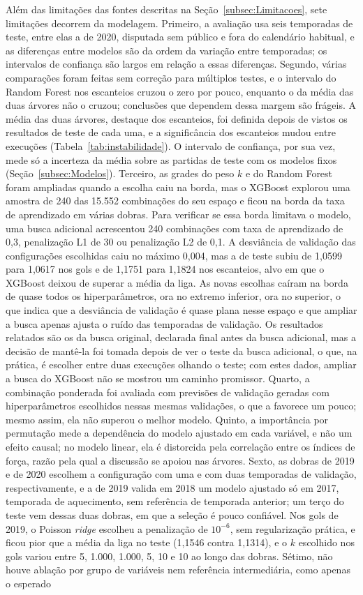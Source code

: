 Além das limitações das fontes descritas na Seção~\ref{subsec:Limitacoes}, sete limitações decorrem da modelagem. Primeiro, a avaliação usa seis temporadas de teste, entre elas a de 2020, disputada sem público e fora do calendário habitual, e as diferenças entre modelos são da ordem da variação entre temporadas; os intervalos de confiança são largos em relação a essas diferenças. Segundo, várias comparações foram feitas sem correção para múltiplos testes, e o intervalo do Random Forest nos escanteios cruzou o zero por pouco, enquanto o da média das duas árvores não o cruzou; conclusões que dependem dessa margem são frágeis. A média das duas árvores, destaque dos escanteios, foi definida depois de vistos os resultados de teste de cada uma, e a significância dos escanteios mudou entre execuções (Tabela~\ref{tab:instabilidade}). O intervalo de confiança, por sua vez, mede só a incerteza da média sobre as partidas de teste com os modelos fixos (Seção~\ref{subsec:Modelos}). Terceiro, as grades do peso $k$ e do Random Forest foram ampliadas quando a escolha caiu na borda, mas o XGBoost explorou uma amostra de 240 das 15.552 combinações do seu espaço e ficou na borda da taxa de aprendizado em várias dobras. Para verificar se essa borda limitava o modelo, uma busca adicional acrescentou 240 combinações com taxa de aprendizado de 0,3, penalização L1 de 30 ou penalização L2 de 0,1. A desviância de validação das configurações escolhidas caiu no máximo 0,004, mas a de teste subiu de 1,0599 para 1,0617 nos gols e de 1,1751 para 1,1824 nos escanteios, alvo em que o XGBoost deixou de superar a média da liga. As novas escolhas caíram na borda de quase todos os hiperparâmetros, ora no extremo inferior, ora no superior, o que indica que a desviância de validação é quase plana nesse espaço e que ampliar a busca apenas ajusta o ruído das temporadas de validação. Os resultados relatados são os da busca original, declarada final antes da busca adicional, mas a decisão de mantê-la foi tomada depois de ver o teste da busca adicional, o que, na prática, é escolher entre duas execuções olhando o teste; com estes dados, ampliar a busca do XGBoost não se mostrou um caminho promissor. Quarto, a combinação ponderada foi avaliada com previsões de validação geradas com hiperparâmetros escolhidos nessas mesmas validações, o que a favorece um pouco; mesmo assim, ela não superou o melhor modelo. Quinto, a importância por permutação mede a dependência do modelo ajustado em cada variável, e não um efeito causal; no modelo linear, ela é distorcida pela correlação entre os índices de força, razão pela qual a discussão se apoiou nas árvores. Sexto, as dobras de 2019 e de 2020 escolhem a configuração com uma e com duas temporadas de validação, respectivamente, e a de 2019 valida em 2018 um modelo ajustado só em 2017, temporada de aquecimento, sem referência de temporada anterior; um terço do teste vem dessas duas dobras, em que a seleção é pouco confiável. Nos gols de 2019, o Poisson \textit{ridge} escolheu a penalização de $10^{-6}$, sem regularização prática, e ficou pior que a média da liga no teste (1,1546 contra 1,1314), e o $k$ escolhido nos gols variou entre 5, 1.000, 1.000, 5, 10 e 10 ao longo das dobras. Sétimo, não houve ablação por grupo de variáveis nem referência intermediária, como apenas o esperado 